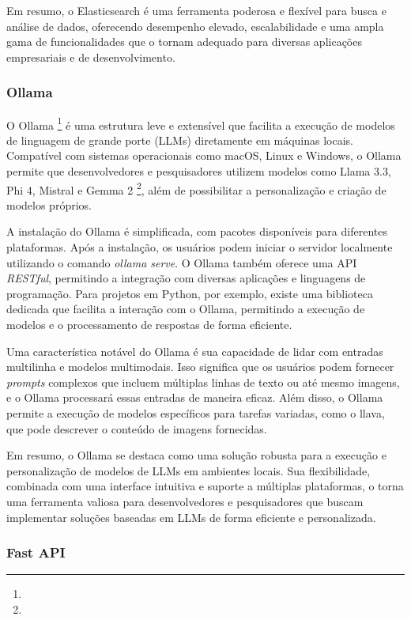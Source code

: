 \documentclass[a4paper, 12pt]{article}
\begin{document}
    Em resumo, o Elasticsearch é uma ferramenta poderosa e flexível para busca e análise de dados, oferecendo desempenho elevado, escalabilidade e uma ampla gama de funcionalidades que o tornam adequado para diversas aplicações empresariais e de desenvolvimento.

    \subsubsection{Ollama} \label{sec:ollama}

    O Ollama \footnote{} é uma estrutura leve e extensível que facilita a execução de modelos de linguagem de grande porte (LLMs) diretamente em máquinas locais. Compatível com sistemas operacionais como macOS, Linux e Windows, o Ollama permite que desenvolvedores e pesquisadores utilizem modelos como Llama 3.3, Phi 4, Mistral e Gemma 2 \footnote{}, além de possibilitar a personalização e criação de modelos próprios.

    A instalação do Ollama é simplificada, com pacotes disponíveis para diferentes plataformas. Após a instalação, os usuários podem iniciar o servidor localmente utilizando o comando \textit{ollama serve}. O Ollama também oferece uma API \textit{RESTful}, permitindo a integração com diversas aplicações e linguagens de programação. Para projetos em Python, por exemplo, existe uma biblioteca dedicada que facilita a interação com o Ollama, permitindo a execução de modelos e o processamento de respostas de forma eficiente.

    Uma característica notável do Ollama é sua capacidade de lidar com entradas multilinha e modelos multimodais. Isso significa que os usuários podem fornecer \textit{prompts} complexos que incluem múltiplas linhas de texto ou até mesmo imagens, e o Ollama processará essas entradas de maneira eficaz. Além disso, o Ollama permite a execução de modelos específicos para tarefas variadas, como o llava, que pode descrever o conteúdo de imagens fornecidas.

    Em resumo, o Ollama se destaca como uma solução robusta para a execução e personalização de modelos de LLMs em ambientes locais. Sua flexibilidade, combinada com uma interface intuitiva e suporte a múltiplas plataformas, o torna uma ferramenta valiosa para desenvolvedores e pesquisadores que buscam implementar soluções baseadas em LLMs de forma eficiente e personalizada.

    \subsubsection{Fast API} \label{sec:fastapi}
\end{document}
